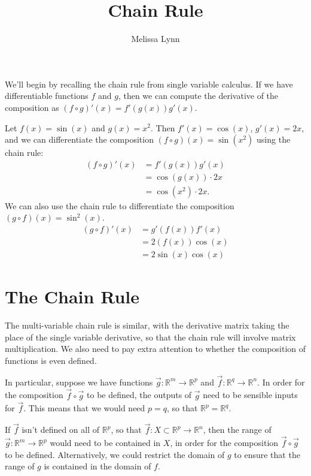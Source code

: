 \documentclass{ximera}
\title{Chain Rule}
\author{Melissa Lynn}
\begin{document}
\begin{abstract}
\end{abstract}
\maketitle

We'll begin by recalling the chain rule from single variable calculus. If we have differentiable functions $f$ and $g$, then we can compute the derivative of the composition as $(f\circ g)'(x) =f'(g(x))g'(x)$.

\begin{example}
Let $f(x) = \sin(x)$ and $g(x) = x^2$. Then $f'(x) = \cos(x)$, $g'(x)=2x$, and we can differentiate the composition $(f\circ g)(x) = \sin(x^2)$ using the chain rule:
\begin{align*}
(f\circ g)'(x) &= f'(g(x))g'(x)\\
&=\cos(g(x))\cdot 2x\\
&=\cos(x^2)\cdot 2x.
\end{align*}
We can also use the chain rule to differentiate the composition $(g\circ f)(x) = \sin^2(x)$.
\begin{align*}
(g\circ f)'(x) &= g'(f(x))f'(x)\\
&=2(f(x))\cos(x)\\
&=2\sin(x)\cos(x)
\end{align*}
\end{example}
 
\section*{The Chain Rule} 
 
 The multi-variable chain rule is similar, with the derivative matrix taking the place of the single variable derivative, so that the chain rule will involve matrix multiplication. We also need to pay extra attention to whether the composition of functions is even defined.
 
 In particular, suppose we have functions $\vec{g}:\mathbb{R}^m\rightarrow\mathbb{R}^p$ and $\vec{f}:\mathbb{R}^q\rightarrow\mathbb{R}^n$. In order for the composition $\vec{f}\circ \vec{g}$ to be defined, the outputs of $\vec{g}$ need to be sensible inputs for $\vec{f}$. This means that we would need $p=q$, so that $\mathbb{R}^p = \mathbb{R}^q$.
 
 If $\vec{f}$ isn't defined on all of $\mathbb{R}^p$, so that $\vec{f}:X\subset \mathbb{R}^p\rightarrow\mathbb{R}^n$, then the range of $\vec{g}:\mathbb{R}^m\rightarrow\mathbb{R}^p$ would need to be contained in $X$, in order for the composition $\vec{f}\circ\vec{g}$ to be defined. Alternatively, we could restrict the domain of $g$ to ensure that the range of $g$ is contained in the domain of $f$.
 
\end{document}
